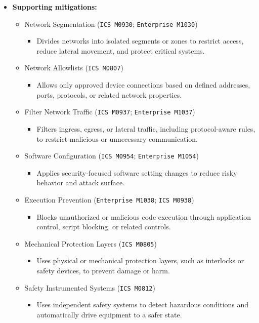 \documentclass[10pt,a4paper,oneside]{report}
\begin{document}
\begin{itemize}
\item \textbf{Supporting mitigations:}
\begin{itemize}
\item Network Segmentation (\texttt{ICS M0930}; \texttt{Enterprise M1030})
\begin{itemize}
\item Divides networks into isolated segments or zones to restrict access, reduce lateral movement, and protect critical systems.
\end{itemize}
\item Network Allowlists (\texttt{ICS M0807})
\begin{itemize}
\item Allows only approved device connections based on defined addresses, ports, protocols, or related network properties.
\end{itemize}
\item Filter Network Traffic (\texttt{ICS M0937}; \texttt{Enterprise M1037})
\begin{itemize}
\item Filters ingress, egress, or lateral traffic, including protocol-aware rules, to restrict malicious or unnecessary communication.
\end{itemize}
\item Software Configuration (\texttt{ICS M0954}; \texttt{Enterprise M1054})
\begin{itemize}
\item Applies security-focused software setting changes to reduce risky behavior and attack surface.
\end{itemize}
\item Execution Prevention (\texttt{Enterprise M1038}; \texttt{ICS M0938})
\begin{itemize}
\item Blocks unauthorized or malicious code execution through application control, script blocking, or related controls.
\end{itemize}
\item Mechanical Protection Layers (\texttt{ICS M0805})
\begin{itemize}
\item Uses physical or mechanical protection layers, such as interlocks or safety devices, to prevent damage or harm.
\end{itemize}
\item Safety Instrumented Systems (\texttt{ICS M0812})
\begin{itemize}
\item Uses independent safety systems to detect hazardous conditions and automatically drive equipment to a safer state.
\end{itemize}
\end{itemize}
\end{itemize}
\end{document}
